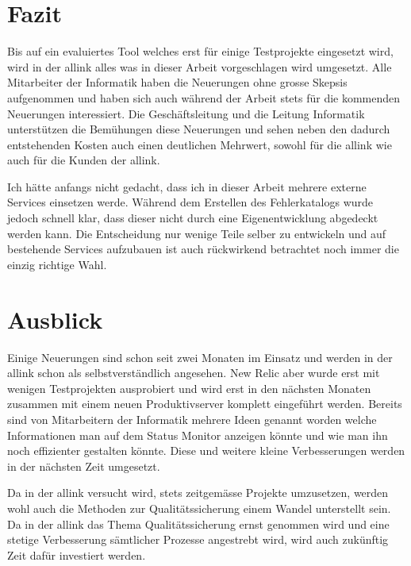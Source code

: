 
\section{Fazit}
\label{sec:fazit}
Bis auf ein evaluiertes Tool welches erst für einige Testprojekte eingesetzt wird, wird in der allink alles was in dieser Arbeit vorgeschlagen wird umgesetzt. Alle Mitarbeiter der Informatik haben die Neuerungen ohne grosse Skepsis aufgenommen und haben sich auch während der Arbeit stets für die kommenden Neuerungen interessiert. Die Geschäftsleitung und die Leitung Informatik unterstützen die Bemühungen diese Neuerungen und sehen neben den dadurch entstehenden Kosten auch einen deutlichen Mehrwert, sowohl für die allink wie auch für die Kunden der allink.

Ich hätte anfangs nicht gedacht, dass ich in dieser Arbeit mehrere externe Services einsetzen werde. Während dem Erstellen des Fehlerkatalogs wurde jedoch schnell klar, dass dieser nicht durch eine Eigenentwicklung abgedeckt werden kann. Die Entscheidung nur wenige Teile selber zu entwickeln und auf bestehende Services aufzubauen ist auch rückwirkend betrachtet noch immer die einzig richtige Wahl.

\section{Ausblick}
\label{sec:ausblick}
Einige Neuerungen sind schon seit zwei Monaten im Einsatz und werden in der allink schon als selbstverständlich angesehen. New Relic aber wurde erst mit wenigen Testprojekten ausprobiert und wird erst in den nächsten Monaten zusammen mit einem neuen Produktivserver komplett eingeführt werden. Bereits sind von Mitarbeitern der Informatik mehrere Ideen genannt worden welche Informationen man auf dem Status Monitor anzeigen könnte und wie man ihn noch effizienter gestalten könnte. Diese und weitere kleine Verbesserungen werden in der nächsten Zeit umgesetzt.

Da in der allink versucht wird, stets zeitgemässe Projekte umzusetzen, werden wohl auch die Methoden zur Qualitätssicherung einem Wandel unterstellt sein. Da in der allink das Thema Qualitätssicherung ernst genommen wird und eine stetige Verbesserung sämtlicher Prozesse angestrebt wird, wird auch zukünftig Zeit dafür investiert werden.

